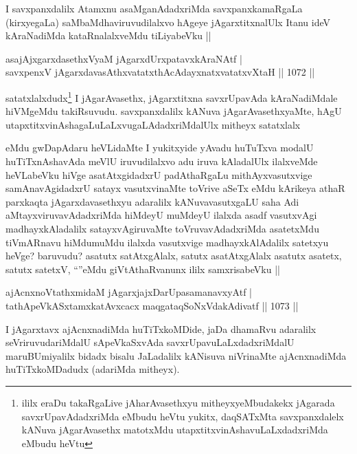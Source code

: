 \begin{artha}
I savxpanxdalilx Atamxnu asaMganAdadxriMda savxpanxkamaRgaLa (kirxyegaLa) saMbaMdhaviruvudilalxvo hAgeye jAgarxtitxnalUlx Itanu ideV kAraNadiMda kataRnalalxveMdu tiLiyabeVku ||
\end{artha}

\begin{shl}
asajAjxgarxdasethxVyaM jAgarxdUrxpatavxkAraNAtf | \\
savxpenxV jAgarxdavasAthxvatatxthAcA\s \s dayxnatxvatatxvXtaH \hfill||  1072 ||  
\end{shl}

\begin{artha}
satatxlalxdudx\footnote{ililx eraDu takaRgaLive jAharAvasethxyu mitheyxyeMbudakekx jAgarada savxrUpavAdadxriMda eMbudu heVtu yukitx, daqSATxMta savxpanxdalelx kANuva jAgarAvasethx matotxMdu utapxtitxvinAshavuLaLxdadxriMda eMbudu heVtu} I jAgarAvasethx, jAgarxtitxna savxrUpavAda kAraNadiMdale hiVMgeMdu takiRsuvudu. savxpanxdalilx kANuva jAgarAvasethxyaMte, hAgU utapxtitxvinAshagaLuLaLxvugaLAdadxriMdalUlx mitheyx satatxlalx
\end{artha}

\begin{artha}
eMdu gwDapAdaru heVLidaMte I yukitxyide yAvadu huTuTxva modalU huTiTxnAshavAda meVlU iruvudilalxvo adu  iruva kAladalUlx ilalxveMde heVLabeVku hiVge asatAtxgidadxrU padAthaRgaLu mithAyxvasutxvige samAnavAgidadxrU satayx vasutxvinaMte toVrive aSeTx eMdu kArikeya athaR parxkaqta jAgarxdavasethxyu adaralilx kANuvavasutxgaLU saha Adi aMtayxviruvavAdadxriMda hiMdeyU muMdeyU ilalxda asadf vasutxvAgi madhayxkAladalilx satayxvAgiruvaMte toVruvavAdadxriMda asatetxMdu tiVmARnavu hiMdumuMdu ilalxda vasutxvige madhayxkAlAdalilx satetxyu heVge? baruvudu? asatutx satAtxgAlalx, satutx asatAtxgAlalx asatutx asatetx, satutx satetxV, ``\stext''eMdu giVtAthaRvanunx ililx samxrisabeVku ||
\end{artha}


\begin{shl}
ajAcnxnoVtathxmidaM jAgarxjajxDarUpasamanavxyAtf | \\
tathA\s peVkASxtamxkatAvxcacx maqgataqSoNxVdakAdivatf \hfill||  1073 ||  
\end{shl}

\begin{artha}
I jAgarxtavx ajAcnxnadiMda huTiTxkoMDide, jaDa dhamaRvu adaralilx seVriruvudariMdalU sApeVkaSxvAda savxrUpavuLaLxdadxriMdalU maruBUmiyalilx bidadx bisalu JaLadalilx kANisuva niVrinaMte ajAcnxnadiMda huTiTxkoMDadudx (adariMda mitheyx).
\end{artha}

